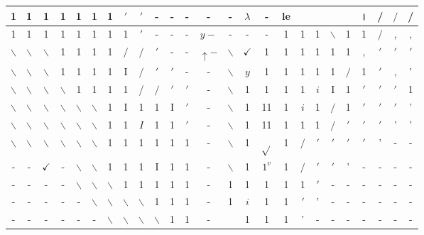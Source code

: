 \documentclass[10pt]{article}
\begin{document}
\begin{center}
\begin{tabular}{|c|c|c|c|c|c|c|c|c|c|c|c|c|c|c|c|c|c|c|c|c|c|c|c|c|}
\hline
1 & 1 & 1 & 1 & 1 & 1 & 1 & $\prime$ & $\prime$ & - & - & - & - & - & $\lambda$ & - & le &  &  &  &  & । & / & $/$ & / \\
\hline
1 & 1 & 1 & 1 & 1 & 1 & 1 & 1 & $\prime$ & - & - & - & $y-$ & - & - & - & 1 & 1 & 1 & $\backslash$ & 1 & 1 & / & , & , \\
\hline
$\backslash$ & $\backslash$ & $\backslash$ & 1 & 1 & 1 & 1 & $/$ & $/$ & $\prime$ & - & - & $\uparrow-$ & $\backslash$ & $\checkmark$ & 1 & 1 & 1 & 1 & 1 & 1 & , & $\prime$ & $\prime$ & $\prime$ \\
\hline
$\backslash$ & $\backslash$ & $\backslash$ & 1 & 1 & 1 & 1 & I & $/$ & $\prime$ & $\prime$ & - & - & $\backslash$ & $y$ & 1 & 1 & 1 & 1 & 1 & $/$ & 1 & $\prime$ & , & ' \\
\hline
$\backslash$ & $\backslash$ & $\backslash$ & $\backslash$ & 1 & 1 & 1 & 1 & / & $/$ & $\prime$ & $\prime$ & - & $\backslash$ & 1 & 1 & 1 & 1 & $i$ & I & 1 & $\prime$ & $\prime$ & $\prime$ & 1 \\
\hline
$\backslash$ & $\backslash$ & $\backslash$ & $\backslash$ & $\backslash$ & $\backslash$ & 1 & I & 1 & 1 & I & $\prime$ & - & $\backslash$ & 1 & 11 & 1 & $i$ & 1 & $/$ & 1 & $\prime$ & $\prime$ & $\prime$ & ' \\
\hline
$\backslash$ & $\backslash$ & $\backslash$ & $\backslash$ & $\backslash$ & $\backslash$ & 1 & 1 & $I$ & 1 & 1 & $\prime$ & - & $\backslash$ & 1 & 11 & 1 & 1 & 1 & $/$ & $\prime$ & $\prime$ & $\prime$ & ' & ' \\
\hline
$\backslash$ & $\backslash$ & $\backslash$ & $\backslash$ & $\backslash$ & $\backslash$ & 1 & 1 & 1 & 1 & 1 & 1 & - & $\backslash$ & 1 & $\sqrt{ }$ & 1 & $/$ & $\prime$ & $\prime$ & $\prime$ & $\prime$ & ' & - & - \\
\hline
- & - & $\checkmark$ & - & $\backslash$ & $\backslash$ & 1 & 1 & 1 & I & 1 & 1 & - & $\backslash$ & 1 & $1^{v}$ & 1 & $/$ & $\prime$ & $\prime$ & ' & - & - & - & - \\
\hline
- & - & - & - & $\backslash$ & $\backslash$ & $\backslash$ & 1 & 1 & 1 & 1 & 1 & - & 1 & 1 & 1 & 1 & 1 & $\prime$ & - & - & - & - & - & - \\
\hline
- & - & - & - & - & $\backslash$ & $\backslash$ & $\backslash$ & $\backslash$ & 1 & 1 & 1 & - & 1 & $i$ & 1 & 1 & $\prime$ & ' & - & - & - & - & - & - \\
\hline
- & - & - & - & - & - & $\backslash$ & $\backslash$ & $\backslash$ & $\backslash$ & 1 & 1 & - &  & 1 & 1 & 1 & ' & - & - & - & - & - & - & - \\

\end{tabular}
\end{center}
\end{document}
